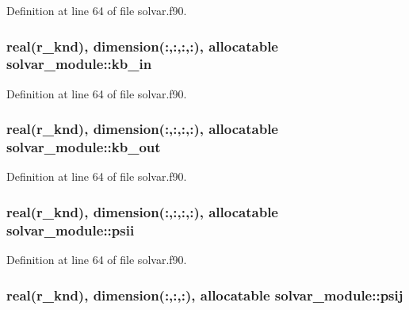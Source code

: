 Definition at line 64 of file solvar.\-f90.

\hypertarget{classsolvar__module_a7e928ad260554afcde0e80147b5176dd}{
\subsubsection[{kb\-\_\-in}]{\setlength{\rightskip}{0pt plus 5cm}real(r\-\_\-knd), dimension(\-:,\-:,\-:,\-:), allocatable solvar\-\_\-module\-::kb\-\_\-in}}\label{classsolvar__module_a7e928ad260554afcde0e80147b5176dd}


Definition at line 64 of file solvar.\-f90.

\hypertarget{classsolvar__module_a500e3ed7d4b1812584b2561e844a1a91}{
\subsubsection[{kb\-\_\-out}]{\setlength{\rightskip}{0pt plus 5cm}real(r\-\_\-knd), dimension(\-:,\-:,\-:,\-:), allocatable solvar\-\_\-module\-::kb\-\_\-out}}\label{classsolvar__module_a500e3ed7d4b1812584b2561e844a1a91}


Definition at line 64 of file solvar.\-f90.

\hypertarget{classsolvar__module_a70ce9ad936b5c35e2638616537a783be}{
\subsubsection[{psii}]{\setlength{\rightskip}{0pt plus 5cm}real(r\-\_\-knd), dimension(\-:,\-:,\-:,\-:), allocatable solvar\-\_\-module\-::psii}}\label{classsolvar__module_a70ce9ad936b5c35e2638616537a783be}


Definition at line 64 of file solvar.\-f90.

\hypertarget{classsolvar__module_a538acac9dd6036215210811a55c04ee8}{
\subsubsection[{psij}]{\setlength{\rightskip}{0pt plus 5cm}real(r\-\_\-knd), dimension(\-:,\-:,\-:), allocatable solvar\-\_\-module\-::psij}}\label{classsolvar__module_a538acac9dd6036215210811a55c04ee8}


